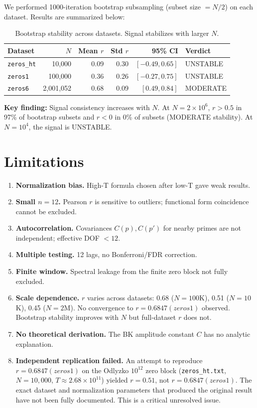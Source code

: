 \documentclass[11pt]{article}
\begin{document}
We performed 1000-iteration bootstrap subsampling (subset size $= N/2$)
on each dataset. Results are summarized below:

\begin{table}[h]
\centering
\begin{tabular}{lrrrrl}
\toprule
Dataset & $N$ & Mean $r$ & Std $r$ & 95\% CI & Verdict \\
\midrule
\texttt{zeros\_ht} & 10,000  & 0.09 & 0.30 & $[-0.49, 0.65]$ & UNSTABLE \\
\texttt{zeros1}   & 100,000 & 0.36 & 0.26 & $[-0.27, 0.75]$ & UNSTABLE \\
\texttt{zeros6}   & 2,001,052 & 0.68 & 0.09 & $[0.49, 0.84]$ & MODERATE \\
\bottomrule
\end{tabular}
\caption{Bootstrap stability across datasets. Signal stabilizes with larger $N$.}
\end{table}

\textbf{Key finding:} Signal consistency increases with $N$.
At $N = 2 \times 10^6$, $r > 0.5$ in 97\% of bootstrap subsets
and $r < 0$ in 0\% of subsets (MODERATE stability).
At $N = 10^4$, the signal is UNSTABLE.

\section{Limitations}

\begin{enumerate}[label=\arabic*.]
\item \textbf{Normalization bias.} High-T formula chosen after low-T gave weak results.
\item \textbf{Small $n=12$.} Pearson $r$ is sensitive to outliers; functional form coincidence cannot be excluded.
\item \textbf{Autocorrelation.} Covariances $C(p), C(p')$ for nearby primes are not independent; effective DOF $<12$.
\item \textbf{Multiple testing.} 12 lags, no Bonferroni/FDR correction.
\item \textbf{Finite window.} Spectral leakage from the finite zero block not fully excluded.
\item \textbf{Scale dependence.} $r$ varies across datasets: 0.68 ($N=100$K), 0.51 ($N=10$K), 0.45 ($N=2$M). No convergence to $r = 0.6847 (zeros1)$ observed. Bootstrap stability improves with $N$ but full-dataset $r$ does not.
\item \textbf{No theoretical derivation.} The BK amplitude constant $C$ has no analytic explanation.
\item \textbf{Independent replication failed.} An attempt to reproduce $r = 0.6847 (zeros1)$ on the Odlyzko $10^{12}$ zero block (\texttt{zeros\_ht.txt}, $N=10{,}000$, $T \approx 2.68 \times 10^{11}$) yielded $r = 0.51$, not $r = 0.6847 (zeros1)$. The exact dataset and normalization parameters that produced the original result have not been fully documented. This is a critical unresolved issue.
\end{enumerate}
\end{document}
